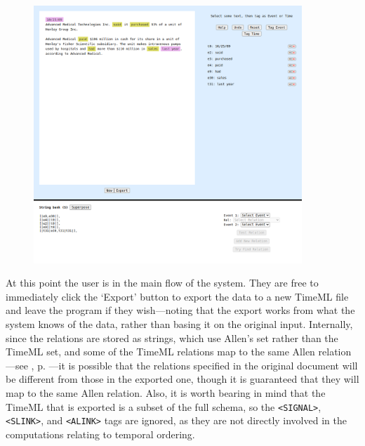 \documentclass[a4paper,12pt,leqno]{article}
\begin{document}
\begin{center}
	\begin{figure}[h!]
		\centering
		\includegraphics[width=0.9\textwidth]{images/START-imported.png}
	\end{figure}
\end{center}
At this point the user is in the main flow of the system. They are free to immediately click the `Export' button to export the data to a new TimeML file and leave the program if they wish---noting that the export works from what the system knows of the data, rather than basing it on the original input. Internally, since the relations are stored as strings, which use Allen's set rather than the TimeML set, and some of the TimeML relations map to the same Allen relation---see , p. \pageref{fig:tlink-allen-translation}---it is possible that the relations specified in the original document will be different from those in the exported one, though it is guaranteed that they will map to the same Allen relation. Also, it is worth bearing in mind that the TimeML that is exported is a subset of the full schema, so the \verb|<SIGNAL>|, \verb|<SLINK>|, and \verb|<ALINK>| tags are ignored, as they are not directly involved in the computations relating to temporal ordering.
\end{document}
